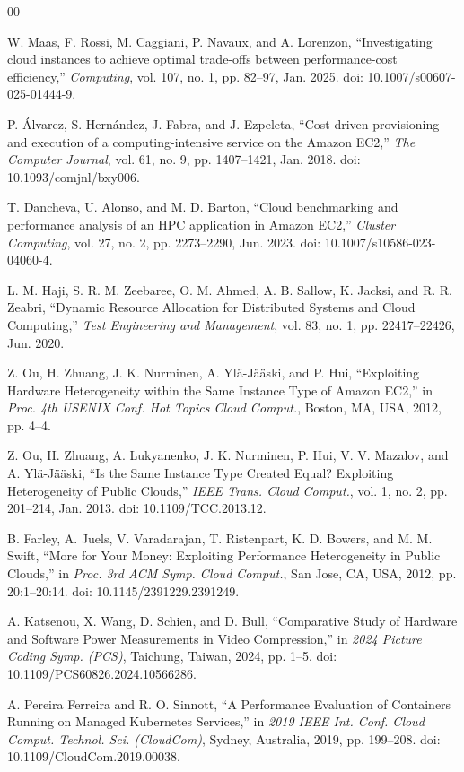 \documentclass[conference]{IEEEtran}
\begin{document}
\begin{thebibliography}{00}

 W. Maas, F. Rossi, M. Caggiani, P. Navaux, and A. Lorenzon,
``Investigating cloud instances to achieve optimal trade-offs between
performance-cost efficiency,'' \emph{Computing}, vol. 107, no. 1,
pp. 82--97, Jan. 2025. doi: 10.1007/s00607-025-01444-9.

 P. Álvarez, S. Hernández, J. Fabra, and J. Ezpeleta,
``Cost-driven provisioning and execution of a computing-intensive service on
the Amazon EC2,'' \emph{The Computer Journal}, vol. 61, no. 9,
pp. 1407--1421, Jan. 2018. doi: 10.1093/comjnl/bxy006.

 T. Dancheva, U. Alonso, and M. D. Barton, ``Cloud benchmarking
and performance analysis of an HPC application in Amazon EC2,''
\emph{Cluster Computing}, vol. 27, no. 2, pp. 2273--2290, Jun. 2023.
doi: 10.1007/s10586-023-04060-4.

 L. M. Haji, S. R. M. Zeebaree, O. M. Ahmed, A. B. Sallow,
K. Jacksi, and R. R. Zeabri, ``Dynamic Resource Allocation for Distributed
Systems and Cloud Computing,'' \emph{Test Engineering and Management},
vol. 83, no. 1, pp. 22417--22426, Jun. 2020.

 Z. Ou, H. Zhuang, J. K. Nurminen, A. Ylä-Jääski, and P. Hui,
``Exploiting Hardware Heterogeneity within the Same Instance Type of Amazon
EC2,'' in \emph{Proc. 4th USENIX Conf. Hot Topics Cloud Comput.}, Boston,
MA, USA, 2012, pp. 4--4.

 Z. Ou, H. Zhuang, A. Lukyanenko, J. K. Nurminen, P. Hui,
V. V. Mazalov, and A. Ylä-Jääski, ``Is the Same Instance Type Created Equal?
Exploiting Heterogeneity of Public Clouds,'' \emph{IEEE Trans. Cloud Comput.},
vol. 1, no. 2, pp. 201--214, Jan. 2013. doi: 10.1109/TCC.2013.12.

 B. Farley, A. Juels, V. Varadarajan, T. Ristenpart, K. D. Bowers,
and M. M. Swift, ``More for Your Money: Exploiting Performance Heterogeneity
in Public Clouds,'' in \emph{Proc. 3rd ACM Symp. Cloud Comput.}, San Jose,
CA, USA, 2012, pp. 20:1--20:14. doi: 10.1145/2391229.2391249.

 A. Katsenou, X. Wang, D. Schien, and D. Bull, ``Comparative Study
of Hardware and Software Power Measurements in Video Compression,'' in
\emph{2024 Picture Coding Symp. (PCS)}, Taichung, Taiwan, 2024, pp. 1--5.
doi: 10.1109/PCS60826.2024.10566286.

 A. Pereira Ferreira and R. O. Sinnott, ``A Performance Evaluation
of Containers Running on Managed Kubernetes Services,'' in \emph{2019 IEEE
Int. Conf. Cloud Comput. Technol. Sci. (CloudCom)}, Sydney, Australia, 2019,
pp. 199--208. doi: 10.1109/CloudCom.2019.00038.


\end{thebibliography}
\end{document}
